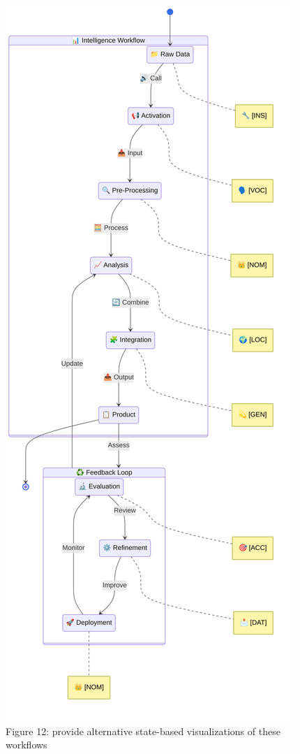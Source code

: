 \documentclass[
  11pt,
  letterpaper,
]{article}
\begin{document}
\begin{figure}
\centering
\includegraphics{figures/Figure_12.png}
\caption{Figure 12: provide alternative state-based visualizations of
these workflows}
\end{figure}
\end{document}
